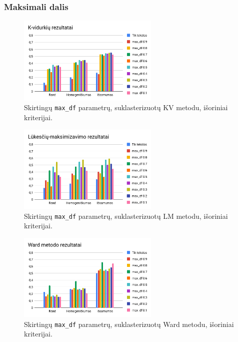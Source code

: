 \documentclass{VUMIFInfBakalaurinis}
\begin{document}
\subsubsection{Maksimali dalis}\label{maxdftest}

\begin{figure}[H]
	\centering
	\includegraphics[width=0.6\textwidth]{./img/image26.png}
  \caption{Skirtingų \texttt{max\_df} parametrų, suklasterizuotų KV metodu, išoriniai
  kriterijai.}
\end{figure}

\begin{figure}[H]
	\centering
	\includegraphics[width=0.6\textwidth]{./img/image3.png}
  \caption{Skirtingų \texttt{max\_df} parametrų, suklasterizuotų LM metodu, išoriniai
  kriterijai.}
\end{figure}

\begin{figure}[H]
	\centering
	\includegraphics[width=0.6\textwidth]{./img/image4.png}
  \caption{Skirtingų \texttt{max\_df} parametrų, suklasterizuotų Ward metodu, išoriniai
  kriterijai.}
\end{figure}
\end{document}
